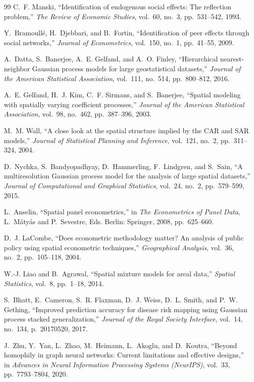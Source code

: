 \documentclass[conference]{IEEEtran}
\theoremstyle{definition}
\begin{document}
\begin{thebibliography}{99}
C.~F. Manski, ``Identification of endogenous social effects: The reflection problem,'' \emph{The Review of Economic Studies}, vol.~60, no.~3, pp.~531--542, 1993.

Y.~Bramoull\'e, H.~Djebbari, and B.~Fortin, ``Identification of peer effects through social networks,'' \emph{Journal of Econometrics}, vol.~150, no.~1, pp.~41--55, 2009.

A.~Datta, S.~Banerjee, A.~E. Gelfand, and A.~O. Finley, ``Hierarchical nearest-neighbor Gaussian process models for large geostatistical datasets,'' \emph{Journal of the American Statistical Association}, vol.~111, no.~514, pp.~800--812, 2016.

A.~E. Gelfand, H.~J. Kim, C.~F. Sirmans, and S.~Banerjee, ``Spatial modeling with spatially varying coefficient processes,'' \emph{Journal of the American Statistical Association}, vol.~98, no.~462, pp.~387--396, 2003.

M.~M. Wall, ``A close look at the spatial structure implied by the CAR and SAR models,'' \emph{Journal of Statistical Planning and Inference}, vol.~121, no.~2, pp.~311--324, 2004.

D.~Nychka, S.~Bandyopadhyay, D.~Hammerling, F.~Lindgren, and S.~Sain, ``A multiresolution Gaussian process model for the analysis of large spatial datasets,'' \emph{Journal of Computational and Graphical Statistics}, vol.~24, no.~2, pp.~579--599, 2015.

L.~Anselin, ``Spatial panel econometrics,'' in \emph{The Econometrics of Panel Data}, L.~M\'aty\'as and P.~Sevestre, Eds. Berlin: Springer, 2008, pp.~625--660.

D.~J. LaCombe, ``Does econometric methodology matter? An analysis of public policy using spatial econometric techniques,'' \emph{Geographical Analysis}, vol.~36, no.~2, pp.~105--118, 2004.

W.-J. Liao and B.~Agrawal, ``Spatial mixture models for areal data,'' \emph{Spatial Statistics}, vol.~8, pp.~1--18, 2014.

S.~Bhatt, E.~Cameron, S.~R. Flaxman, D.~J. Weiss, D.~L. Smith, and P.~W. Gething, ``Improved prediction accuracy for disease risk mapping using Gaussian process stacked generalization,'' \emph{Journal of the Royal Society Interface}, vol.~14, no.~134, p.~20170520, 2017.

J.~Zhu, Y.~Yan, L.~Zhao, M.~Heimann, L.~Akoglu, and D.~Koutra, ``Beyond homophily in graph neural networks: Current limitations and effective designs,'' in \emph{Advances in Neural Information Processing Systems (NeurIPS)}, vol.~33, pp.~7793--7804, 2020.

\end{thebibliography}
\end{document}
